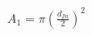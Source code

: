 \documentclass[preview]{standalone}
\begin{document}
\begin{align*}
A_1 = \pi \left(\frac{d_{In}}{2}\right)^2
\end{align*}
\end{document}

